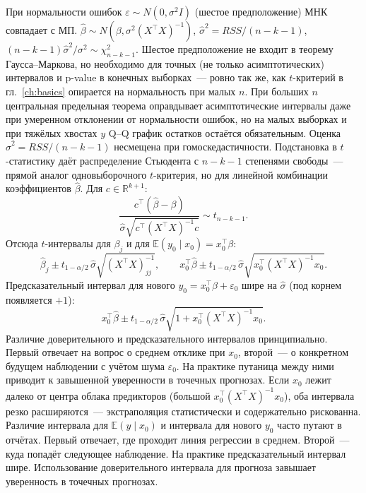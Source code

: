 При нормальности ошибок $\varepsilon\sim N(0,\sigma^2 I)$ (шестое предположение) МНК совпадает с МП. $\hat\beta\sim N(\beta,\sigma^2(X^\top X)^{-1})$, $\hat\sigma^2=RSS/(n-k-1)$, $(n-k-1)\hat\sigma^2/\sigma^2\sim\chi^2_{n-k-1}$.
Шестое предположение не входит в теорему Гаусса--Маркова, но необходимо для точных (не только асимптотических) интервалов и p-value в конечных выборках~--- ровно так же, как $t$-критерий в гл.~\ref{ch:basics} опирается на нормальность при малых $n$.
При больших $n$ центральная предельная теорема оправдывает асимптотические интервалы даже при умеренном отклонении от нормальности ошибок, но на малых выборках и при тяжёлых хвостах $y$ Q--Q график остатков остаётся обязательным.
Оценка $\hat\sigma^2=RSS/(n-k-1)$ несмещена при гомоскедастичности. Подстановка в $t$-статистику даёт распределение Стьюдента с $n-k-1$ степенями свободы~--- прямой аналог одновыборочного $t$-критерия, но для линейной комбинации коэффициентов $\hat\beta$.
Для $c\in\mathbb{R}^{k+1}$:
\[ \frac{c^\top(\hat\beta-\beta)}{\hat\sigma\sqrt{c^\top(X^\top X)^{-1}c}} \sim t_{n-k-1}.
\]
Отсюда $t$-интервалы для $\beta_j$ и для $\mathbb{E}(y_0\mid x_0)=x_0^\top\beta$:
\[ \hat\beta_j \pm t_{1-\alpha/2}\,\hat\sigma\sqrt{(X^\top X)^{-1}_{jj}}, \qquad x_0^\top\hat\beta \pm t_{1-\alpha/2}\,\hat\sigma\sqrt{x_0^\top(X^\top X)^{-1}x_0}.
\]
Предсказательный интервал для нового $y_0=x_0^\top\beta+\varepsilon_0$ шире на $\hat\sigma$ (под корнем появляется $+1$):
\[ x_0^\top\hat\beta \pm t_{1-\alpha/2}\,\hat\sigma\sqrt{1+x_0^\top(X^\top X)^{-1}x_0}.
\]
Различие доверительного и предсказательного интервалов принципиально. Первый отвечает на вопрос о среднем отклике при $x_0$, второй~--- о конкретном будущем наблюдении с учётом шума $\varepsilon_0$.
На практике путаница между ними приводит к завышенной уверенности в точечных прогнозах.
Если $x_0$ лежит далеко от центра облака предикторов (большой $x_0^\top(X^\top X)^{-1}x_0$), оба интервала резко расширяются~--- экстраполяция статистически и содержательно рискованна.
Различие интервала для $\mathbb{E}(y\mid x_0)$ и интервала для нового $y_0$ часто путают в отчётах. Первый отвечает, где проходит линия регрессии в среднем. Второй~--- куда попадёт следующее наблюдение.
На практике предсказательный интервал шире. Использование доверительного интервала для прогноза завышает уверенность в точечных прогнозах.

